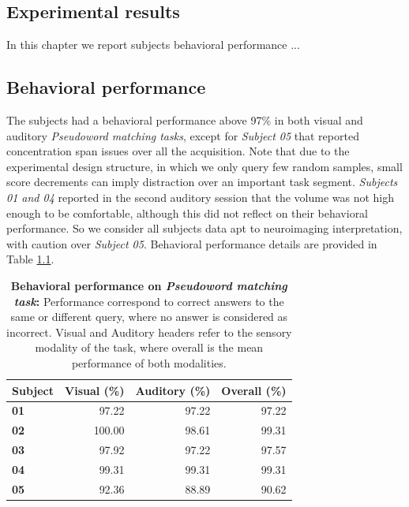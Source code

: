 \begin{fullwidth}
\chapter{\label{ch:super_syllables}
Experimental results}
\end{fullwidth}

\begin{chabstract}

In this chapter we report subjects behavioral performance ...

\end{chabstract}


\section{Behavioral performance}
%
The subjects had a behavioral performance above 97\% in both visual and auditory \emph{Pseudoword matching tasks}, except for \emph{Subject 05} that reported concentration span issues over all the acquisition.
Note that due to the experimental design structure, in which we only query few random samples, small score decrements can imply distraction over an important task segment.
\emph{Subjects 01 and 04} reported in the second auditory session that the volume was not high enough to be comfortable, although this did not reflect on their behavioral performance.
So we consider all subjects data apt to neuroimaging interpretation, with caution over \emph{Subject 05}. Behavioral performance details are provided in Table \ref{table:behavior}.


\begin{table}
\begin{tabular}{|>{\bfseries}l|rrr|}
\toprule
Subject &  Visual (\%) &  Auditory (\%) &  Overall (\%) \\
\midrule
01 &        97.22 &          97.22 &    97.22 \\
02 &       100.00 &          98.61 &    99.31 \\
03 &        97.92 &          97.22 &    97.57 \\
04 &        99.31 &          99.31 &    99.31 \\
05 &        92.36 &          88.89 &    90.62 \\
\bottomrule
\end{tabular}
\caption{\textbf{Behavioral performance on \emph{Pseudoword matching task}:} Performance correspond to correct answers to the same or different query, where no answer is considered as incorrect. Visual and Auditory headers refer to the sensory modality of the task, where overall is the mean performance of both modalities.}
\label{table:behavior}
\end{table}


